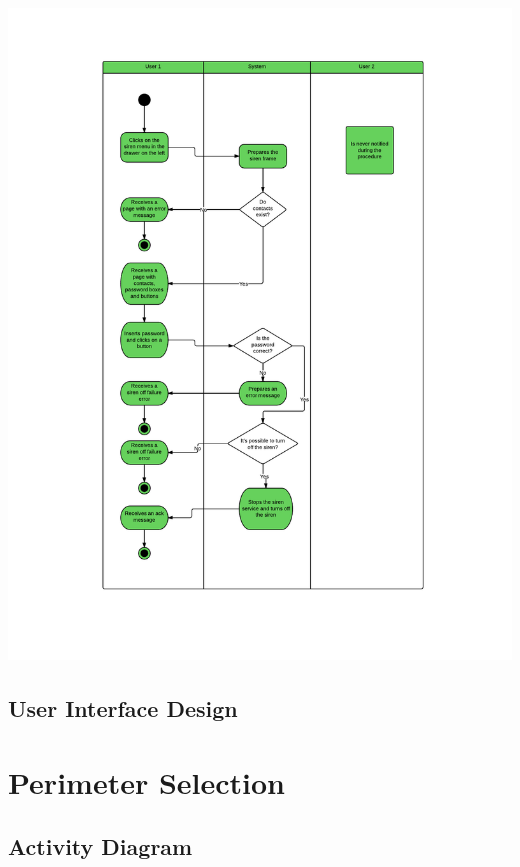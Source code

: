 \includegraphics[scale=0.7]{images/SirenOff}

\newpage
\subsection{User Interface Design}

\section{Perimeter Selection}

\newpage
\subsection{Activity Diagram}

